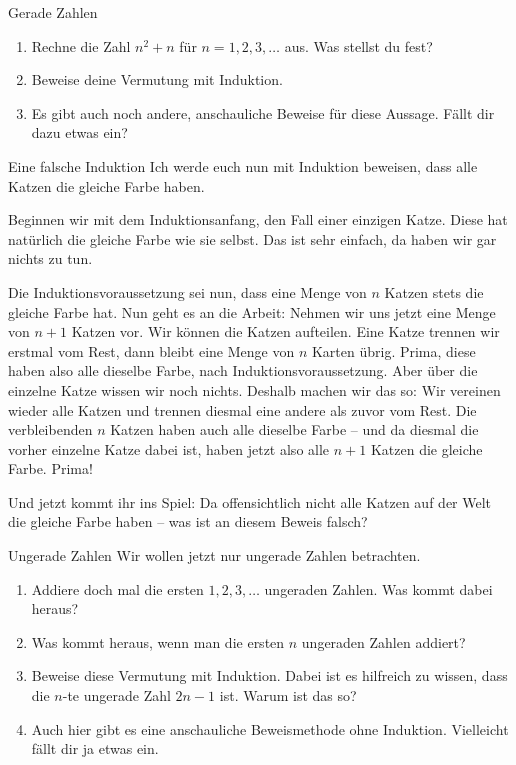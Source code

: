 \documentclass{../zirkelblatt1415}
\begin{document}
\begin{aufgabe}{Gerade Zahlen}
\begin{enumerate}
 \item Rechne die Zahl $n^2 + n$ f\"ur $n = 1,2,3,\ldots$ aus. Was stellst du fest?
 \item Beweise deine Vermutung mit Induktion.
 \item Es gibt auch noch andere, anschauliche Beweise f\"ur diese Aussage. F\"allt dir dazu etwas ein?
\end{enumerate}\fixlistspacing
\end{aufgabe}

\begin{aufgabe}{Eine falsche Induktion}
Ich werde euch nun mit Induktion beweisen, dass alle Katzen die gleiche Farbe haben.

Beginnen wir mit dem Induktionsanfang, den Fall einer einzigen Katze.
Diese hat nat\"urlich die gleiche Farbe wie sie selbst. Das ist sehr einfach, da haben wir gar nichts zu tun.

Die Induktionsvoraussetzung sei nun, dass eine Menge von $n$ Katzen stets die gleiche Farbe hat.
Nun geht es an die Arbeit: Nehmen wir uns jetzt eine Menge von $n+1$ Katzen vor.
Wir k\"onnen die Katzen aufteilen. Eine Katze trennen wir erstmal vom Rest, dann bleibt eine Menge von $n$ Karten \"ubrig.
Prima, diese haben also alle dieselbe Farbe, nach Induktionsvoraussetzung.
Aber \"uber die einzelne Katze wissen wir noch nichts. Deshalb machen wir das so:
Wir vereinen wieder alle Katzen und trennen diesmal eine andere als zuvor vom Rest.
Die verbleibenden $n$ Katzen haben auch alle dieselbe Farbe -- und da diesmal die vorher einzelne Katze dabei ist, 
haben jetzt also alle $n+1$ Katzen die gleiche Farbe.
Prima!

Und jetzt kommt ihr ins Spiel: Da offensichtlich nicht alle Katzen auf der Welt die gleiche Farbe haben -- 
was ist an diesem Beweis falsch?
\end{aufgabe}

\begin{aufgabe}{Ungerade Zahlen}
Wir wollen jetzt nur ungerade Zahlen betrachten.
\begin{enumerate}
\item Addiere doch mal die ersten $1, 2, 3, \ldots$ ungeraden Zahlen. Was kommt dabei heraus?
\item Was kommt heraus, wenn man die ersten $n$ ungeraden Zahlen addiert? 
\item Beweise diese Vermutung mit Induktion. Dabei ist es hilfreich zu wissen, dass die $n$-te ungerade Zahl $2n-1$ ist.
      Warum ist das so?
\item Auch hier gibt es eine anschauliche Beweismethode ohne Induktion. Vielleicht f\"allt dir ja etwas ein.      
\end{enumerate}\fixlistspacing
\end{aufgabe}
\end{document}
